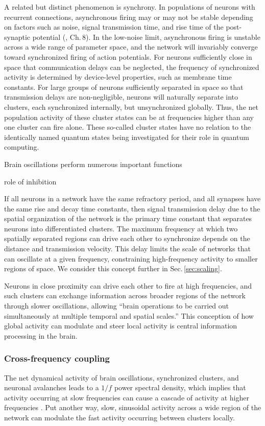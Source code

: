 \documentclass[twocolumn]{article}
\begin{document}
A related but distinct phenomenon is synchrony. In populations of neurons with recurrent connections, asynchronous firing may or may not be stable depending on factors such as noise, signal transmission time, and rise time of the post-synaptic potential (\cite{geki2002}, Ch.\,8). In the low-noise limit, asynchronous firing is unstable across a wide range of parameter space, and the network will invariably converge toward synchronized firing of action potentials. For neurons sufficiently close in space that communication delays can be neglected, the frequency of synchronized activity is determined by device-level properties, such as membrane time constants. For large groups of neurons sufficiently separated in space so that transmission delays are non-negligible, neurons will naturally separate into clusters, each synchronized internally, but unsynchronized globally. Thus, the net population activity of these cluster states can be at frequencies higher than any one cluster can fire alone. These so-called cluster states have no relation to the identically named quantum states being investigated for their role in quantum computing. 

Brain oscillations perform numerous important functions

role of inhibition

If all neurons in a network have the same refractory period, and all synapses have the same rise and decay time constants, then signal transmission delay due to the spatial organization of the network is the primary time constant that separates neurons into differentiated clusters. The maximum frequency at which two spatially separated regions can drive each other to synchronize depends on the distance and transmission velocity. This delay limits the scale of networks that can oscillate at a given frequency, constraining high-frequency activity to smaller regions of space. We consider this concept further in Sec.\,\ref{sec:scaling}. 

Neurons in close proximity can drive each other to fire at high frequencies, and such clusters can exchange information across broader regions of the network through slower oscillations, allowing ``brain operations to be carried out simultaneously at multiple temporal and spatial scales.'' \cite{budr2004} This conception of how global activity can modulate and steer local activity is central information processing in the brain. 


 

\subsubsection{Cross-frequency coupling}
The net dynamical activity of brain oscillations, synchronized clusters, and neuronal avalanches leads to a $1/f$ power spectral density, which implies that activity occurring at slow frequencies can cause a cascade of activity at higher frequencies \cite{budr2004}. Put another way, slow, sinusoidal activity across a wide region of the network can modulate the fast activity occurring between clusters locally.  
\end{document}
